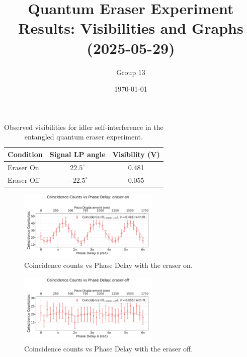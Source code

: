 \documentclass{article}
\title{Quantum Eraser Experiment Results: Visibilities and Graphs (2025-05-29)}
\author{Group 13} %
\date{\today}
\begin{document}
\pagestyle{empty} %

\begin{table}[h!]
\centering
\begin{tabular}{lcc}
\toprule
\textbf{Condition} & \textbf{Signal LP angle} & \textbf{Visibility (V)} \\
\midrule
Eraser On          & $22.5^\circ$  & 0.481 \\
Eraser Off         & $-22.5^\circ$ & 0.055 \\
\bottomrule
\end{tabular}
\caption{Observed visibilities for idler self-interference in the entangled quantum eraser experiment.}
\end{table}


\begin{figure}[h!]
\centering
\includegraphics[width=0.6\textwidth]{coincidence_counts_eraser_on.pdf}
\caption{Coincidence counts vs Phase Delay with the eraser on.}
\end{figure}


\begin{figure}[h!]
\centering
\includegraphics[width=0.6\textwidth]{coincidence_counts_eraser_off.pdf}
\caption{Coincidence counts vs Phase Delay with the eraser off.}
\end{figure}
\end{document}
